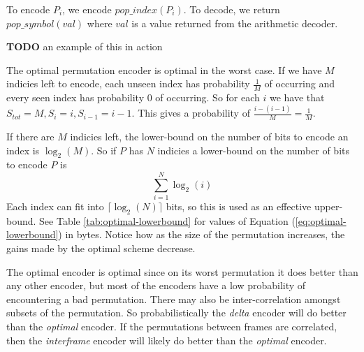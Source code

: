 \documentclass[a4paper]{report}
\newcommand{\todo}{\textbf{TODO} }
\begin{document}
To encode $P_i$, we encode $pop\_index(P_i)$. To decode, we return
$pop\_symbol(val)$ where $val$ is a value returned from the arithmetic
decoder.

\todo an example of this in action

The optimal permutation encoder is optimal in the worst case. If we have $M$
indicies left to encode, each unseen index has probability $\frac{1}{M}$ of
occurring and every seen index has probability $0$ of occurring. So for each
$i$ we have that $S_{tot}=M, S_i = i, S_{i-1} = i-1$. This gives a probability
of $\frac{i-(i-1)}{M} = \frac{1}{M}$.

If there are $M$ indicies left, the lower-bound on the number of bits to
encode an index is $\log_2(M)$. So if $P$ has $N$ indicies a lower-bound on
the number of bits to encode $P$ is
\begin{equation}
  \displaystyle\sum^{N}_{i=1} \log_2(i)
  \label{eq:optimal-lowerbound}
\end{equation}
Each index can fit into $\lceil\log_2(N)\rceil$ bits, so this is used as an
effective upper-bound. See Table \ref{tab:optimal-lowerbound} for values of
Equation (\ref{eq:optimal-lowerbound}) in bytes. Notice how as the size of the
permutation increases, the gains made by the optimal scheme decrease.


\begin{table}
  \center
  \caption{Number of bytes needed for storing permutations of different
    sizes. See Equation (\ref{eq:optimal-lowerbound}) for the lower bound. The
    effective upper-bound is
    $\lceil\log_2(N)\rceil/8$.} \label{tab:optimal-lowerbound}
\end{table}

The optimal encoder is optimal since on its worst permutation it does better
than any other encoder, but most of the encoders have a low probability of
encountering a bad permutation. There may also be inter-correlation amongst
subsets of the permutation. So probabilistically the \emph{delta} encoder will
do better than the \emph{optimal} encoder. If the permutations between frames
are correlated, then the \emph{interframe} encoder will likely do better than
the \emph{optimal} encoder.
\end{document}
